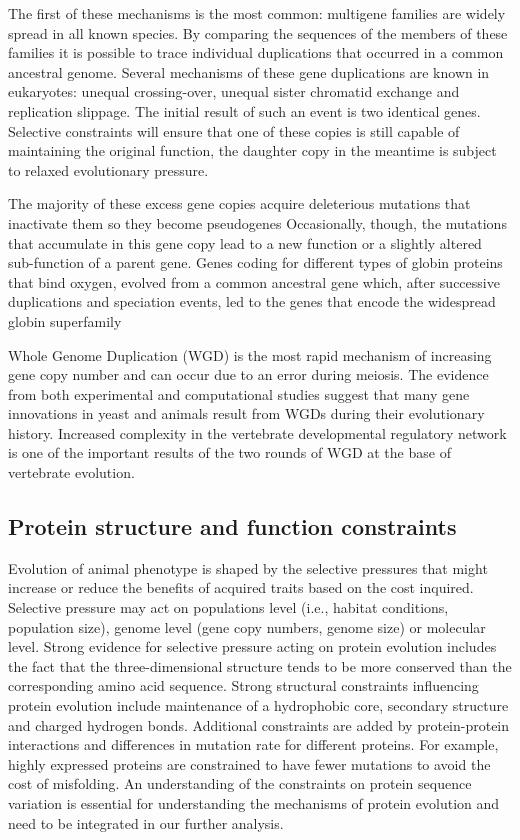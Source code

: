 \documentclass[11pt, a4paper,oneside]{report}
\begin{document}
The first of these mechanisms is the most common: multigene families are widely spread in all known species. By comparing the sequences of the members of these families it is possible to trace individual duplications that occurred in a common ancestral genome. Several mechanisms of these gene duplications are known in eukaryotes: unequal crossing-over, unequal sister chromatid exchange and replication slippage. The initial result of such an event is two identical genes. Selective constraints will ensure that one of these copies is still capable of maintaining the original function, the daughter copy in the meantime is subject to relaxed evolutionary pressure.

The majority of these excess gene copies acquire deleterious mutations that inactivate them so they become pseudogenes\cite{Zhang2001} Occasionally, though, the mutations that accumulate in this gene copy lead to a new function or a slightly altered sub-function of a parent gene.  Genes coding for different types of globin proteins that bind oxygen, evolved from a common ancestral gene which, after successive duplications and speciation events, led to the genes that encode the widespread globin superfamily\cite{Hardison1998}

Whole Genome Duplication (WGD) is the most rapid mechanism of increasing gene copy number and can occur due to an error during meiosis. The evidence from both experimental and computational studies\cite{Dehal2005} suggest that many gene innovations in yeast and animals result from WGDs during their evolutionary history. Increased complexity in the vertebrate developmental regulatory network is one of the important results of the two rounds of WGD at the base of vertebrate evolution\cite{Huminiecki2012}. 

\subsection{Protein structure and function constraints}
Evolution of animal phenotype is shaped by the selective pressures that might increase or reduce the benefits of acquired traits based on the cost inquired. Selective pressure may act on populations level (i.e., habitat conditions, population size), genome level (gene copy numbers, genome size) or molecular level. Strong evidence for selective pressure acting on protein evolution includes the fact that the three-dimensional structure tends to be more conserved than the corresponding amino acid sequence\cite{Illergard2009}. Strong structural constraints influencing protein evolution include maintenance of a hydrophobic core, secondary structure and charged hydrogen bonds.  
Additional constraints are added by protein-protein interactions\cite{Park2001} and differences in mutation rate for different proteins. For example, highly expressed proteins are constrained to have fewer mutations to avoid the cost of misfolding\cite{Subramanian2004}.  An understanding of the constraints on protein sequence variation is essential for understanding the mechanisms of protein evolution and need to be integrated in our further analysis. 
\end{document}
